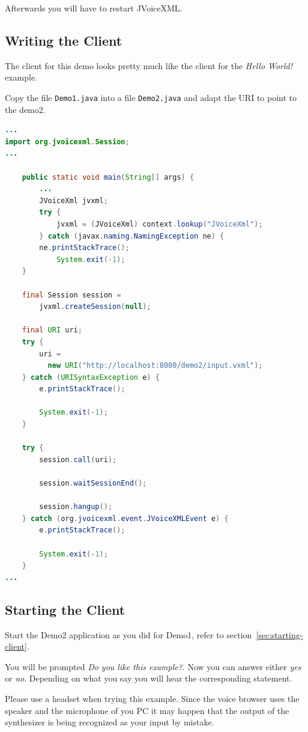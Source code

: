 \documentclass[11pt,a4paper]{article}
\begin{document}
Afterwards you will have to restart JVoiceXML.

\subsection{Writing the Client}

The client for this demo looks pretty much like the client for the \emph{Hello
World!} example.

Copy the file \texttt{Demo1.java} into a file \texttt{Demo2.java} and adapt the
URI to point to the demo2.

\begin{lstlisting}[language=Java]
...
import org.jvoicexml.Session;
...

    public static void main(String[] args) {
        ...
        JVoiceXml jvxml;
        try {
            jvxml = (JVoiceXml) context.lookup("JVoiceXml");
        } catch (javax.naming.NamingException ne) {
	    ne.printStackTrace();
            System.exit(-1);
    }

    final Session session = 
        jvxml.createSession(null);

    final URI uri;
    try {
        uri = 
          new URI("http://localhost:8080/demo2/input.vxml");
    } catch (URISyntaxException e) {
        e.printStackTrace();

        System.exit(-1);
    }

    try {
        session.call(uri);

        session.waitSessionEnd();

        session.hangup();
    } catch (org.jvoicexml.event.JVoiceXMLEvent e) {
        e.printStackTrace();

        System.exit(-1);
    }
...
\end{lstlisting}

\subsection{Starting the Client}

Start the Demo2 application as you did for Demo1, refer to
section~\ref{sec:starting-client}.

You will be prompted \emph{Do you like this example?}. Now you can answer
either \emph{yes} or \emph{no}. Depending on what you say you will hear the
corresponding statement.

Please use a headset when trying this example. Since the voice browser uses the
speaker and the microphone of you PC it may happen that the output of the
synthesizer is being recognized as your input by mistake.
\end{document}
